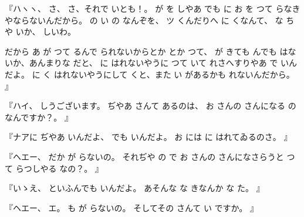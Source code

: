 『ハヽヽ、
さ、
さ、それで
いとも！。
が
を
しやあ
でも
に
お
を
つて
らなきやならないんだから。
の
い
の
なんぞを、
ツ
くんだりへ
に
くなんて、
な
ちや
いか、
しいわ。

だから
あ
が
つて
るんで
られないからとか
とか
つて、
が
きても
んでも
はないか、あんまりな
だと、
に
はれないやうに
つて
いて
れさへすりやあ
で
いんだよ。
に
く
はれないやうにして
くと、また
い
があるかも
れないんだから。
』

『ハイ、
しうございます。
ぢやあ
さんて
あるのは、
お
さんの
さんになる
の
なんですか？。
』

『ナアに
ぢやあ
いんだよ、
でも
いんだよ。
お
には
に
はれてゐるのさ。
』

『ヘエー、
だか
が
らないの。
それぢや
の
で
お
さんの
さんになさらうと
つて
らつしやる
なの？。
』

『いゝえ、
といふんでも
いんだよ。
あそんな
な
きなんか
な
た。
』

『ヘエー、
エ。
も
が
らないの。
そしてその
さんて
い
ですか。
』


